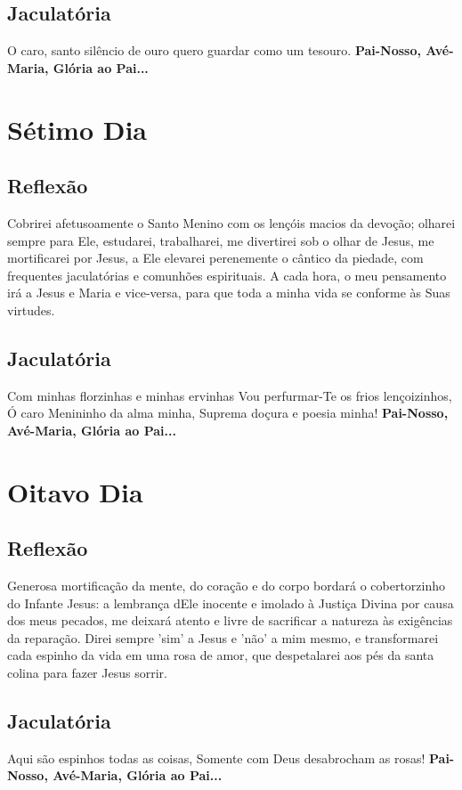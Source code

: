 \documentclass[11pt]{article}
\begin{document}
\subsection{Jaculatória}
O caro, santo silêncio de ouro
quero guardar como um tesouro.
\textbf{Pai-Nosso, Avé-Maria, Glória ao Pai... }

\section{Sétimo Dia}
\subsection{Reflexão}
Cobrirei afetusoamente o Santo Menino com os lençóis macios da devoção; olharei sempre para Ele, estudarei, trabalharei, me divertirei sob o olhar de Jesus, me mortificarei por Jesus, a Ele elevarei perenemente o cântico da piedade, com frequentes jaculatórias e comunhões espirituais. A cada hora, o meu pensamento irá a Jesus e Maria e vice-versa, para que toda a minha vida se conforme às Suas virtudes.

\subsection{Jaculatória}
Com minhas florzinhas e minhas ervinhas
Vou perfurmar-Te os frios lençoizinhos,
Ó caro Menininho da alma minha,
Suprema doçura e poesia minha!
\textbf{Pai-Nosso, Avé-Maria, Glória ao Pai... }

\section{Oitavo Dia}
\subsection{Reflexão}
Generosa mortificação da mente, do coração e do corpo bordará o cobertorzinho do Infante Jesus: a lembrança dEle inocente e imolado à Justiça Divina por causa dos meus pecados, me deixará atento e livre de sacrificar a natureza às exigências da reparação. Direi sempre 'sim' a Jesus e 'não' a mim mesmo, e transformarei cada espinho da vida em uma rosa de amor, que despetalarei aos pés da santa colina para fazer Jesus sorrir.

\subsection{Jaculatória}
Aqui são espinhos todas as coisas,
Somente com Deus desabrocham as rosas!
\textbf{Pai-Nosso, Avé-Maria, Glória ao Pai... }
\end{document}
